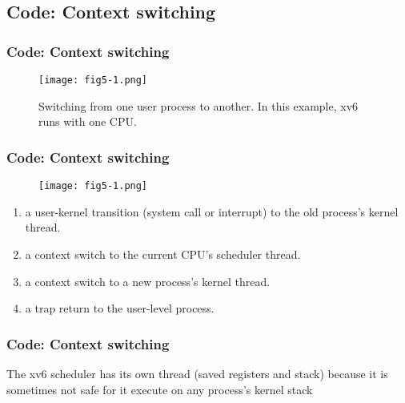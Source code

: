 \documentclass{beamer}
\begin{document}

\subsection{Code: Context switching}


\begin{frame}[t]
  \frametitle{Code: Context switching}

  \begin{figure}[ht]
    \centering
    \texttt{[image: fig5-1.png]}
    \caption{Switching from one user process to another.
      In this example, xv6 runs with one CPU.}
  \end{figure}
  
\end{frame}


\begin{frame}[t]
  \frametitle{Code: Context switching}

  \begin{figure}[ht]
    \centering
    \texttt{[image: fig5-1.png]}
  \end{figure}

  \begin{enumerate}
  \item a user-kernel transition (system call or interrupt) to the old process’s kernel thread.
  \item a context switch to the current CPU’s scheduler thread.
  \item a context switch to a new process’s kernel thread.
  \item a trap return to the user-level process.
  \end{enumerate}
  
\end{frame}


\begin{frame}[t]
  \frametitle{Code: Context switching}
  The xv6 scheduler has its own thread (saved registers and stack) because it is sometimes not
  safe for it execute on any process’s kernel stack
  
\end{frame}
\end{document}
